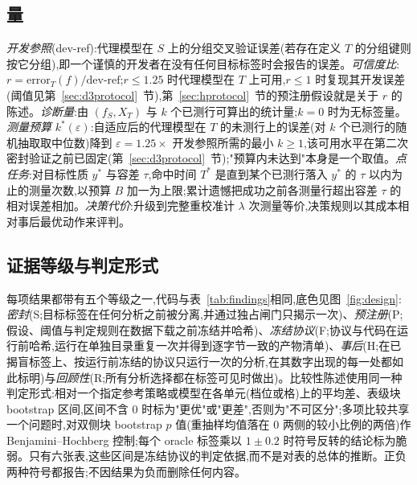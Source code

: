 \documentclass[11pt,a4paper]{ctexart}
\begin{document}
\subsection{量}
\label{sec:fw-quantities}
\emph{开发参照}(dev-ref):代理模型在 $S$ 上的分组交叉验证误差(若存在定义 $T$ 的分组键则按它分组),即一个谨慎的开发者在没有任何目标标签时会报告的误差。\emph{可信度比}:$r = \mathrm{error}_T(f)/\text{dev-ref}$;$r \le 1.25$ 时代理模型在 $T$ 上可用,$r \le 1$ 时复现其开发误差(阈值见第~\ref{sec:d3protocol}~节),第~\ref{sec:hprotocol}~节的预注册假设就是关于 $r$ 的陈述。\emph{诊断量}:由 $(f_S, X_T)$ 与 $k$ 个已测行可算出的统计量;$k=0$ 时为无标签量。\emph{测量预算} $k^{*}(\varepsilon)$:自适应后的代理模型在 $T$ 的未测行上的误差(对 $k$ 个已测行的随机抽取取中位数)降到 $\varepsilon = 1.25 \times$ 开发参照所需的最小 $k \ge 1$,该可用水平在第二次密封验证之前已固定(第~\ref{sec:d3protocol}~节);"预算内未达到"本身是一个取值。\emph{点任务}:对目标性质 $y^{*}$ 与容差 $\tau$,命中时间 $T^{*}$ 是直到某个已测行落入 $y^{*}$ 的 $\tau$ 以内为止的测量次数,以预算 $B$ 加一为上限;累计遗憾把成功之前各测量行超出容差 $\tau$ 的相对误差相加。\emph{决策代价}:升级到完整重校准计 $\lambda$ 次测量等价,决策规则以其成本相对事后最优动作来评判。

\subsection{证据等级与判定形式}
\label{sec:fw-evidence}
每项结果都带有五个等级之一,代码与表~\ref{tab:findings}相同,底色见图~\ref{fig:design}:\emph{密封}(S;目标标签在任何分析之前被分离,并通过独占闸门只揭示一次)、\emph{预注册}(P;假设、阈值与判定规则在数据下载之前冻结并哈希)、\emph{冻结协议}(F;协议与代码在运行前哈希,运行在单独目录重复一次并得到逐字节一致的产物清单)、\emph{事后}(H;在已揭盲标签上、按运行前冻结的协议只运行一次的分析,在其数字出现的每一处都如此标明)与\emph{回顾性}(R;所有分析选择都在标签可见时做出)。比较性陈述使用同一种判定形式:相对一个指定参考策略或模型在各单元(档位或格)上的平均差、表级块 bootstrap 区间,区间不含 0 时标为"更优"或"更差",否则为"不可区分";多项比较共享一个问题时,对双侧块 bootstrap $p$ 值(重抽样均值落在 0 两侧的较小比例的两倍)作 Benjamini--Hochberg 控制;每个 oracle 标签乘以 $1 \pm 0.2$ 时符号反转的结论标为脆弱。只有六张表,这些区间是冻结协议的判定依据,而不是对表的总体的推断。正负两种符号都报告;不因结果为负而删除任何内容。
\end{document}
